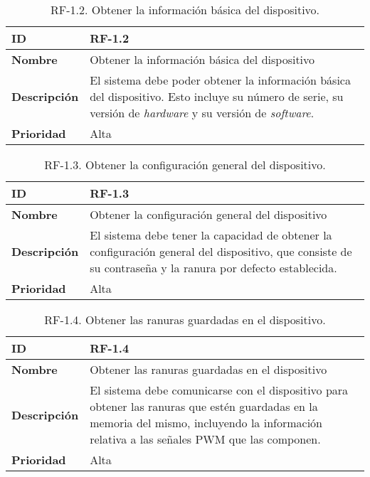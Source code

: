 \begin{table}[h!]
    \centering
    \begin{tabular}{|m{2.5cm}|m{9.27cm}|}
        \hline
        \textbf{ID} & RF-1.2 \\
        \hline
        \textbf{Nombre} & Obtener la información básica del dispositivo \\
        \hline
        \textbf{Descripción} & El sistema debe poder obtener la información básica del dispositivo. Esto incluye su número de serie, su versión de \textit{hardware} y su versión de \textit{software}. \\
        \hline
        \textbf{Prioridad} & Alta \\
        \hline
    \end{tabular}
    \caption{RF-1.2. Obtener la información básica del dispositivo.}
\end{table}

\begin{table}[h!]
    \centering
    \begin{tabular}{|m{2.5cm}|m{9.27cm}|}
        \hline
        \textbf{ID} & RF-1.3 \\
        \hline
        \textbf{Nombre} & Obtener la configuración general del dispositivo \\
        \hline
        \textbf{Descripción} & El sistema debe tener la capacidad de obtener la configuración general del dispositivo, que consiste de su contraseña y la ranura por defecto establecida. \\
        \hline
        \textbf{Prioridad} & Alta \\
        \hline
    \end{tabular}
    \caption{RF-1.3. Obtener la configuración general del dispositivo.}
\end{table}

\begin{table}[h!]
    \centering
    \begin{tabular}{|m{2.5cm}|m{9.27cm}|}
        \hline
        \textbf{ID} & RF-1.4 \\
        \hline
        \textbf{Nombre} & Obtener las ranuras guardadas en el dispositivo \\
        \hline
        \textbf{Descripción} & El sistema debe comunicarse con el dispositivo para obtener las ranuras que estén guardadas en la memoria del mismo, incluyendo la información relativa a las señales PWM que las componen. \\
        \hline
        \textbf{Prioridad} & Alta \\
        \hline
    \end{tabular}
    \caption{RF-1.4. Obtener las ranuras guardadas en el dispositivo.}
\end{table}

